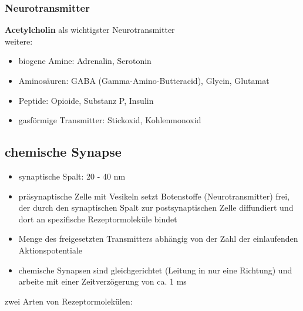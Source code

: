 \subsubsection{Neurotransmitter}
\textbf{Acetylcholin} als wichtigster Neurotransmitter\\
weitere:
\begin{itemize}
	\item biogene Amine: Adrenalin, Serotonin
	\item Aminosäuren: GABA (Gamma-Amino-Butteracid), Glycin, Glutamat
	\item Peptide: Opioide, Substanz P, Insulin
	\item gasförmige Transmitter: Stickoxid, Kohlenmonoxid
\end{itemize}

\subsection{chemische Synapse}
\begin{itemize}
	\item synaptische Spalt: 20 - 40 nm
	\item präsynaptische Zelle mit Vesikeln setzt Botenstoffe (Neurotransmitter) frei, der durch den synaptischen Spalt zur postsynaptischen Zelle diffundiert und dort an spezifische Rezeptormoleküle bindet
	\item Menge des freigesetzten Transmitters abhängig von der Zahl der einlaufenden Aktionspotentiale
	\item chemische Synapsen sind gleichgerichtet (Leitung in nur eine Richtung) und arbeite mit einer Zeitverzögerung von ca. 1 ms
\end{itemize}
\newpage
zwei Arten von Rezeptormolekülen:
